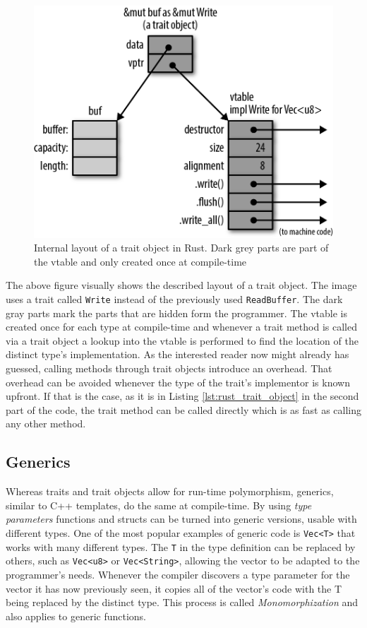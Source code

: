 \begin{figure}[h!]
	\centering \includegraphics[width=\linewidth]{PICs/rust_vtable.png}
	\caption{Internal layout of a trait object in Rust. Dark grey parts are part of the vtable and only created once at compile-time}
	\label{fig:rust_vtable}
\end{figure}

\noindent
The above figure visually shows the described layout of a trait object. The image uses a trait called \texttt{Write} instead of the previously used \texttt{ReadBuffer}. The dark gray parts mark the parts that are hidden form the programmer. The vtable is created once for each type at compile-time and whenever a trait method is called via a trait object a lookup into the vtable is performed to find the location of the distinct type's implementation. As the interested reader now might already has guessed, calling methods through trait objects introduce an overhead.
That overhead can be avoided whenever the type of the trait's implementor is known upfront. If that is the case, as it is in Listing \ref{lst:rust_trait_object} in the second part of the code, the trait method can be called directly which is as fast as calling any other method.

\subsection{Generics}

Whereas traits and trait objects allow for run-time polymorphism, generics, similar to C++ templates, do the same at compile-time. By using \textit{type parameters} functions and structs can be turned into generic versions, usable with different types. One of the most popular examples of generic code is \texttt{Vec<T>} that works with many different types. The \texttt{T} in the type definition can be replaced by others, such as \texttt{Vec<u8>} or \texttt{Vec<String>}, allowing the vector to be adapted to the programmer's needs. Whenever the compiler discovers a type parameter for the vector it has now previously seen, it copies all of the vector's code with the T being replaced by the distinct type. This process is called \textit{Monomorphization} and also applies to generic functions.\\

